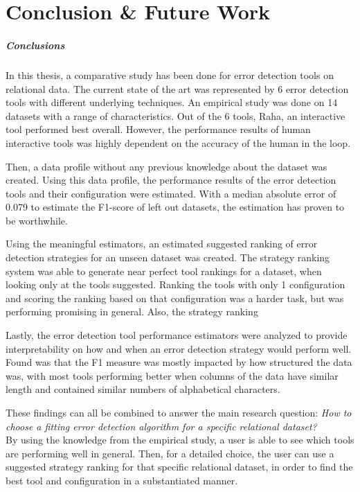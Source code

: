 \chapter{Conclusion \& Future Work}
\label{chap:conclusion}
\paragraph{Conclusions}
In this thesis, a comparative study has been done for error detection tools on relational data. 
The current state of the art was represented by 6 error detection tools with different underlying techniques. An empirical study was done on 14 datasets with a range of characteristics. Out of the 6 tools, Raha, an interactive tool performed best overall. However, the performance results of human interactive tools was highly dependent on the accuracy of the human in the loop.

Then, a data profile without any previous knowledge about the dataset was created. Using this data profile, the performance results of the error detection tools and their configuration were estimated. With a median absolute error of 0.079 to estimate the F1-score of left out datasets, the estimation has proven to be worthwhile. 

Using the meaningful estimators, an estimated suggested ranking of error detection strategies for an unseen dataset was created. The strategy ranking system was able to generate near perfect tool rankings for a dataset, when looking only at the tools suggested. Ranking the tools with only 1 configuration and scoring the ranking based on that configuration was a harder task, but was performing promising in general. Also, the strategy ranking 

Lastly, the error detection tool performance estimators were analyzed to provide interpretability on how and when an error detection strategy would perform well. Found was that the F1 measure was mostly impacted by how structured the data was, with most tools performing better when columns of the data have similar length and contained similar numbers of alphabetical characters. 

These findings can all be combined to answer the main research question: \textit{How to choose a fitting error detection algorithm for a specific relational dataset?} 
\\By using the knowledge from the empirical study, a user is able to see which tools are performing well in general. Then, for a detailed choice, the user can use a suggested strategy ranking for that specific relational dataset, in order to find the best tool and configuration in a substantiated manner.

